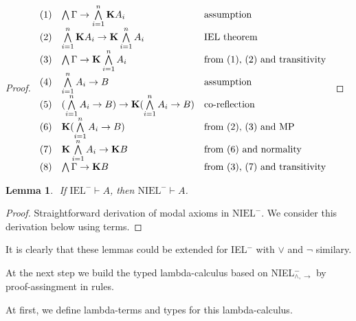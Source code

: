 \documentclass[a4paper]{article}
\newtheorem{lemma}{Lemma}
\begin{document}
\begin{proof}
$\begin{array}{lll}
(1) &\bigwedge \Gamma \rightarrow \bigwedge \limits_{i = 1}^{n} {\bf K} A_i & \text{assumption} \\
(2) &\bigwedge \limits_{i = 1}^{n} {\bf K} A_i \rightarrow {\bf K} \bigwedge \limits_{i = 1}^{n} A_i& \text{IEL theorem} \\
(3) &\bigwedge \Gamma \rightarrow {\bf K} \bigwedge \limits_{i = 1}^{n} A_i & \text{from (1), (2) and transitivity} \\
(4) &\bigwedge \limits_{i = 1}^{n} A_i \rightarrow B& \text{assumption} \\
(5) &(\bigwedge \limits_{i = 1}^{n} A_i \rightarrow B) \rightarrow {\bf K} (\bigwedge \limits_{i = 1}^{n} A_i \rightarrow B)& \text{co-reflection}\\
(6) &{\bf K} (\bigwedge \limits_{i = 1}^{n} A_i \rightarrow B)& \text{from (2), (3) and MP} \\
(7) &{\bf K} \bigwedge \limits_{i = 1}^{n} A_i \rightarrow {\bf K} B & \text{from (6) and normality} \\
(8) &\bigwedge \Gamma \rightarrow {\bf K} B & \text{from (3), (7) and transitivity}
\end{array}$

  \end{proof}

\begin{lemma}
  $ $
  If $\text{IEL}^{-} \vdash A$, then $\text{NIEL}^{-} \vdash A$.
\end{lemma}

\begin{proof}
  Straightforward derivation of modal axioms in $\text{NIEL}^{-}$. We consider this derivation below using terms.
\end{proof}

It is clearly that these lemmas could be extended for IEL$^{-}$ with $\vee$ and $\neg$ similary.

  \vspace{\baselineskip}

  At the next step we build the typed lambda-calculus based on NIEL$^{-}_{\land, \to}$ by proof-assingment in
  rules.

  At first, we define lambda-terms and types for this lambda-calculus.

  \vspace{\baselineskip}
\end{document}
